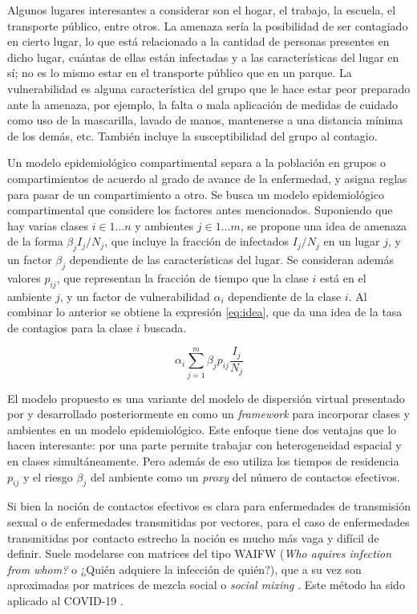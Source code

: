 \begin{intro}
Algunos lugares interesantes a considerar son el hogar, el trabajo, la escuela, el transporte público, entre otros. La amenaza sería la posibilidad de ser contagiado en cierto lugar, lo que está relacionado a la cantidad de personas presentes en dicho lugar, cuántas de ellas están infectadas y a las características del lugar en sí; no es lo mismo estar en el transporte público que en un parque. La vulnerabilidad es alguna característica del grupo que le hace estar peor preparado ante la amenaza, por ejemplo, la falta o mala aplicación de medidas de cuidado como uso de la mascarilla, lavado de manos, mantenerse a una distancia mínima de los demás, etc. También incluye la susceptibilidad del grupo al contagio.

Un modelo epidemiológico compartimental separa a la población en grupos o compartimientos de acuerdo al grado de avance de la enfermedad, y asigna reglas para pasar de un compartimiento a otro. Se busca un modelo epidemiológico compartimental que considere los factores antes mencionados. Suponiendo que hay varias clases \(i \in 1 \dots n\) y ambientes \(j \in 1 \dots m\), se propone una idea de amenaza de la forma \(\beta_j I_j/N_j\), que incluye la fracción de infectados \(I_j/N_j\) en un lugar \(j\), y un factor \(\beta_j\) dependiente de las características del lugar. Se consideran además valores \(p_{ij}\), que representan la fracción de tiempo que la clase \(i\) está en el ambiente \(j\), y un factor de vulnerabilidad \(\alpha_i\) dependiente de la clase \(i\). Al combinar lo anterior se obtiene la expresión \ref{eq:idea}, que da una idea de la tasa de contagios para la clase \(i\) buscada.

\begin{equation}\label{eq:idea}
\alpha_i \sum_{j = 1}^m \beta_j p_{ij} \frac{I_j}{N_j}
\end{equation}


El modelo propuesto es una variante del modelo de dispersión virtual presentado por \cite{Bichara2015} y desarrollado posteriormente en \cite{Bichara2018} como un \textit{framework} para incorporar clases y ambientes en un modelo epidemiológico. Este enfoque tiene dos ventajas que lo hacen interesante: por una parte permite trabajar con heterogeneidad espacial y en clases simultáneamente. Pero además de eso utiliza los tiempos de residencia \(p_{ij}\) y el riesgo \(\beta_j\) del ambiente como un \textit{proxy} del número de contactos efectivos.

Si bien la noción de contactos efectivos es clara para enfermedades de transmisión sexual o de enfermedades transmitidas por vectores, para el caso de enfermedades transmitidas por contacto estrecho la noción es mucho más vaga y difícil de definir. Suele modelarse con matrices del tipo WAIFW (\textit{Who aquires infection from whom?} o ¿Quién adquiere la infección de quién?), que a su vez son aproximadas por matrices de mezcla social o \textit{social mixing} \cite{Mossong2008}\cite{Prem2017}. Este método ha sido aplicado al COVID-19 \cite{Prem2020}. 


\end{intro}
